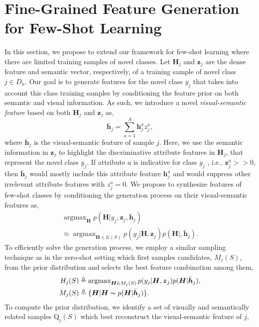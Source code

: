 \documentclass[10pt,journal,compsoc]{IEEEtran}
\newcommand{\z}{\boldsymbol{z}}
\newcommand{\h}{\boldsymbol{h}}
\renewcommand{\H}{\boldsymbol{H}}
\newcommand{\1}{\boldsymbol{1}}
\newcommand{\0}{\boldsymbol{0}}
\newcommand{\U}{\mathcal{U}}
\newcommand{\Q}{\mathrm{Q}}
\newcommand{\argmax}{\operatorname{argmax}}
\newcommand{\<}{\langle}
\renewcommand{\>}{\rangle}
\begin{document}
\section{Fine-Grained Feature Generation for Few-Shot Learning}
\label{sec:visual_semantic_information}
In this section, we propose to extend our framework for few-shot learning where there are limited training samples of novel classes.
Let $\H_j$ and $\z_j$ are the dense feature and semantic vector, respectively, of a training sample of novel class $j \in D_n$.
Our goal is to generate features for the novel class $y_j$ that takes into account this class training samples by conditioning the feature prior on both semantic and visual information.
As such, we introduce a novel \textit{visual-semantic feature} based on both $\H_j$ and $\z_j$ as,
\begin{equation}
\bar{\h}_j = \sum^A_{a=1}\h^a_j z^a_j,
\end{equation}
where $\bar{\h}_j$ is the visual-semantic feature of sample $j$.
Here, we use the semantic information in $\z_j$ to highlight the discriminative attribute features in $\H_j$, that represent the novel class $y_j$.
If attribute $a$ is indicative for class $y_j$ , i.e., $\z^a_j >> 0$, then $\bar{\h}_j$ would mostly include this attribute feature $\h^a_j$ and would suppress other irrelevant attribute features with $z^a_j=0$.
We propose to synthesize features of few-shot classes by conditioning the generation process on their visual-semantic features as,
\begin{multline}
\argmax_{\H}p(\H|y_j,\z_j,\bar{\h}_j) \\
 \approx \argmax_{\H\in \U(S)}p(y_j|\H,\z_j)p(\H|,\bar{\h}_j).
\label{eq:compose_fs}
\end{multline}
To efficiently solve the generation process, we employ a similar sampling technique as in the zero-shot setting which first samples candidates, $M_j(S)$, from the prior distribution and selects the best feature combination among them,
\begin{equation}
\begin{split}
H_j(S) &\triangleq \argmax_{\H\in M_j(S)}p(y_j|\H,\z_j)p(\H|\bar{\h}_j),\\
\label{eq:novel_compose_fs}
M_j(S) &\triangleq \{\H|\H\thicksim p(\H|\bar{\h}_j)\}.
\end{split}
\end{equation}
To compute the prior distribution, we identify a set of visually and semantically related samples $\Q_j(S)$ which best reconstruct the visual-semantic feature of $j$, 
\end{document}
